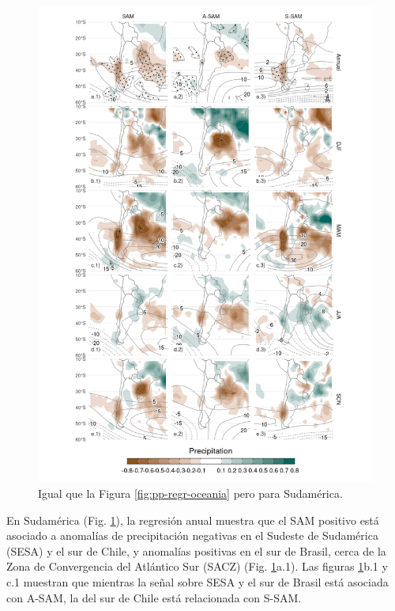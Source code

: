 \documentclass[12pt,oneside,a4paper]{reedthesis}
\begin{document}
\begin{figure}

{\centering \includegraphics{figures/30-sam/pp-regr-america-1} 

}

\caption{Igual que la Figura \ref{fig:pp-regr-oceania} pero para Sudamérica.}\label{fig:pp-regr-america}
\end{figure}

En Sudamérica (Fig. \ref{fig:pp-regr-america}), la regresión anual muestra que el SAM positivo está asociado a anomalías de precipitación negativas en el Sudeste de Sudamérica (SESA) y el sur de Chile, y anomalías positivas en el sur de Brasil, cerca de la Zona de Convergencia del Atlántico Sur (SACZ) (Fig. \ref{fig:pp-regr-america}a.1).
Las figuras \ref{fig:pp-regr-america}b.1 y c.1 muestran que mientras la señal sobre SESA y el sur de Brasil está asociada con A-SAM, la del sur de Chile está relacionada con S-SAM.
\end{document}
